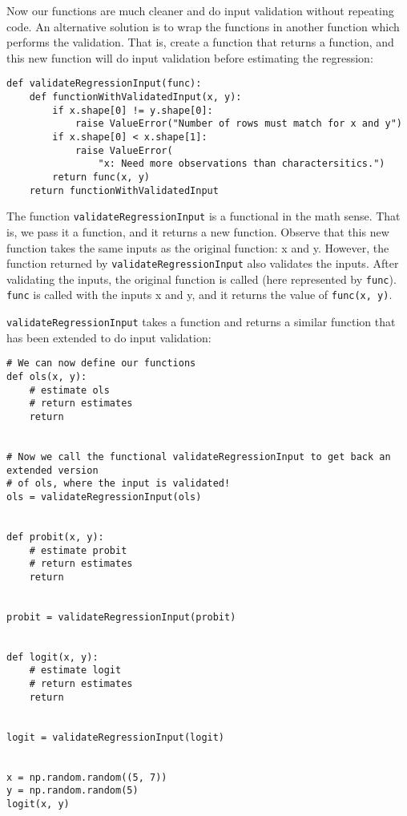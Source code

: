 \documentclass[12pt, a4paper]{article}
\begin{document}
Now our functions are much cleaner and do input validation without repeating code.
An alternative solution is to wrap the functions in another function which performs the validation.
That is, create a function that returns a function, and this new function will do input validation before estimating the regression:
\lstset{language=jupyter-python,label= ,caption= ,captionpos=b,numbers=none}
\begin{lstlisting}
def validateRegressionInput(func):
    def functionWithValidatedInput(x, y):
        if x.shape[0] != y.shape[0]:
            raise ValueError("Number of rows must match for x and y")
        if x.shape[0] < x.shape[1]:
            raise ValueError(
                "x: Need more observations than charactersitics.")
        return func(x, y)
    return functionWithValidatedInput
\end{lstlisting}

The function \texttt{validateRegressionInput} is a functional in the math sense.
That is, we pass it a function, and it returns a new function.
Observe that this new function takes the same inputs as the original function: x and y.
However, the function returned by \texttt{validateRegressionInput} also validates the inputs.
After validating the inputs, the original function is called (here represented by \texttt{func}).
\texttt{func} is called with the inputs x and y, and it returns the value of \texttt{func(x, y)}.

\texttt{validateRegressionInput} takes a function and returns a similar function that has been extended to do input validation:
\lstset{language=jupyter-python,label= ,caption= ,captionpos=b,numbers=none}
\begin{lstlisting}
# We can now define our functions
def ols(x, y):
    # estimate ols
    # return estimates
    return


# Now we call the functional validateRegressionInput to get back an extended version
# of ols, where the input is validated!
ols = validateRegressionInput(ols)


def probit(x, y):
    # estimate probit
    # return estimates
    return


probit = validateRegressionInput(probit)


def logit(x, y):
    # estimate logit
    # return estimates
    return


logit = validateRegressionInput(logit)


x = np.random.random((5, 7))
y = np.random.random(5)
logit(x, y)
\end{lstlisting}
\end{document}
